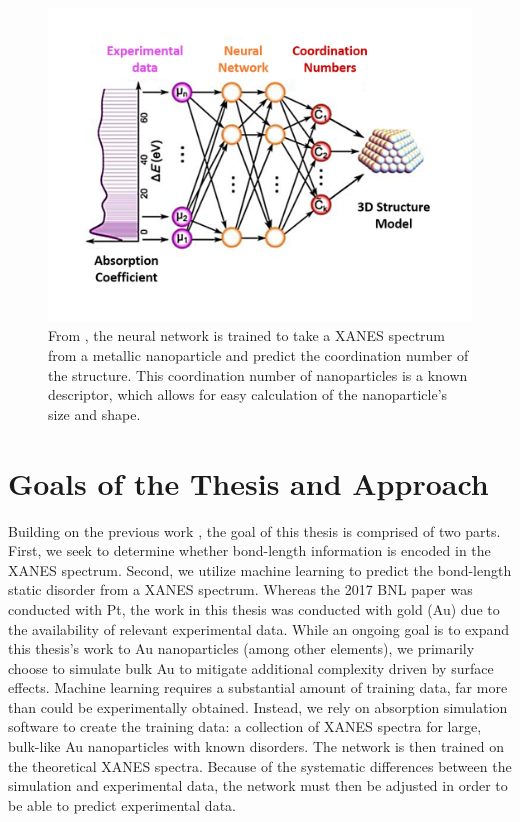 \begin{figure}[h!]
    \centering
    \includegraphics[width=.75\linewidth]{Chapters/Figures/placeholderFrenkel2017.png}
    \caption[ANN for Metallic Nanoparticle Coordination Numbers]{From \cite{Timoshenko2017}, the neural network is trained to take a XANES spectrum from a metallic nanoparticle and predict the coordination number of the structure. This coordination number of nanoparticles is a known descriptor, which allows for easy calculation of the nanoparticle's size and shape.}
\end{figure}

\section{Goals of the Thesis and Approach}
Building on the previous work \cite{Timoshenko2017}, the goal of this thesis is comprised of two parts. First, we seek to determine whether bond-length information is encoded in the XANES spectrum. Second, we utilize machine learning to predict the bond-length static disorder from a XANES spectrum. Whereas the 2017 BNL paper \cite{Timoshenko2017} was conducted with Pt, the work in this thesis was conducted with gold (Au) due to the availability of relevant experimental data. While an ongoing goal is to expand this thesis's work to Au nanoparticles (among other elements), we primarily choose to simulate bulk Au to mitigate additional complexity driven by surface effects. Machine learning requires a substantial amount of training data, far more than could be experimentally obtained. Instead, we rely on absorption simulation software to create the training data: a collection of XANES spectra for large, bulk-like Au nanoparticles with known disorders. The network is then trained on the theoretical XANES spectra. Because of the systematic differences between the simulation and experimental data, the network must then be adjusted in order to be able to predict experimental data.

